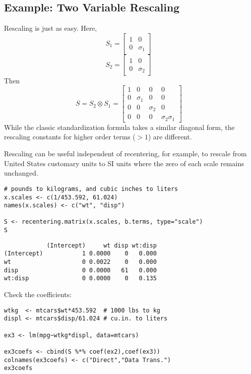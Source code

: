 \documentclass[]{article}
\begin{document}
\subsection{Example: Two Variable
Rescaling}\label{example-two-variable-rescaling}

Rescaling is just as easy. Here,
\[S_1=\begin{bmatrix}1 &0 \\ 0 &\sigma_1 \end{bmatrix}\]
\[S_2=\begin{bmatrix}1 &0 \\ 0 &\sigma_2 \end{bmatrix}\] Then
\[S = S_2 \otimes S_1 = \begin{bmatrix} 1 &0 &0 &0 \\
  0 &\sigma_1 &0 &0 \\ 0 &0 &\sigma_2 &0 \\ 0 &0 &0 &\sigma_2\sigma_1 \end{bmatrix}\]
While the classic standardization formula takes a similar diagonal form,
the rescaling constants for higher order terms (\(>1\)) are different.

Rescaling can be useful independent of recentering, for example, to
rescale from United States customary units to SI units where the zero of
each scale remains unchanged.

\begin{verbatim}
# pounds to kilograms, and cubic inches to liters
x.scales <- c(1/453.592, 61.024)
names(x.scales) <- c("wt", "disp")
  
S <- recentering.matrix(x.scales, b.terms, type="scale")
S
\end{verbatim}

\begin{verbatim}
            (Intercept)     wt disp wt:disp
(Intercept)           1 0.0000    0   0.000
wt                    0 0.0022    0   0.000
disp                  0 0.0000   61   0.000
wt:disp               0 0.0000    0   0.135
\end{verbatim}

Check the coefficients:

\begin{verbatim}
wtkg  <- mtcars$wt*453.592  # 1000 lbs to kg
displ <- mtcars$disp/61.024 # cu.in. to liters

ex3 <- lm(mpg~wtkg*displ, data=mtcars)

ex3coefs <- cbind(S %*% coef(ex2),coef(ex3))
colnames(ex3coefs) <- c("Direct","Data Trans.")
ex3coefs
\end{verbatim}
\end{document}
